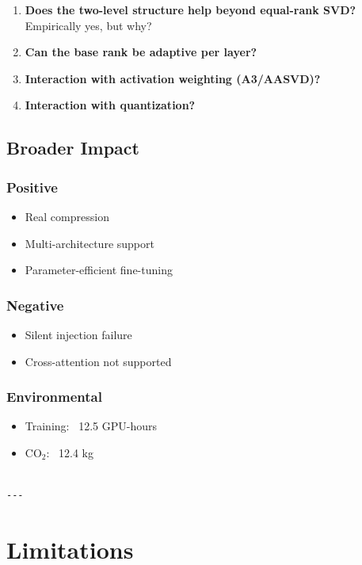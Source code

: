 \begin{enumerate}
\item \textbf{Does the two-level structure help beyond equal-rank SVD?}
  Empirically yes, but why?
\item \textbf{Can the base rank be adaptive per layer?}
\item \textbf{Interaction with activation weighting (A3/AASVD)?}
\item \textbf{Interaction with quantization?}

\end{enumerate}
\subsection{Broader Impact}

\subsubsection{Positive}
\begin{itemize}
\item Real compression
\item Multi-architecture support
\item Parameter-efficient fine-tuning

\end{itemize}
\subsubsection{Negative}
\begin{itemize}
\item Silent injection failure
\item Cross-attention not supported

\end{itemize}
\subsubsection{Environmental}
\begin{itemize}
\item Training: ~12.5 GPU-hours
\item CO$_2$: ~12.4 kg
\end{itemize}
\begin{lstlisting}

---
\end{lstlisting}

\section{Limitations}

